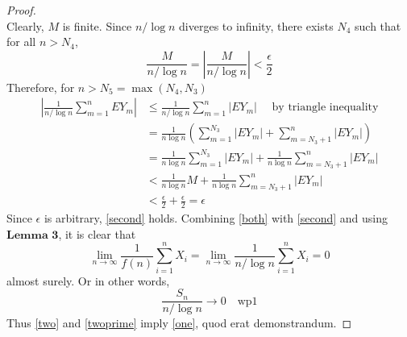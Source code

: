 \documentclass[letterpaper, 12pt]{article}
\begin{document}
\begin{proof}
\[\]
Clearly, $M$ is finite. Since $n / \log n$ diverges to infinity, there exists $N_4$ such that for all $n > N_4$,
\[
\frac{M}{n /\log n} 
=
\left\lvert
\frac{M}{n /\log n}
\right\rvert
< \frac{\epsilon}{2}
\]
Therefore, for $n > N_5 = \max(N_4, N_3)$
\begin{align*}
\left \lvert
\frac{1}{n / \log n}
\sum_{m = 1}^n EY_m
\right \rvert
&\leq
\frac{1}{n / \log n}
\sum_{m = 1}^n |EY_m|
\quad\text{ by triangle inequality}
\\
&=
\frac{1}{n \log n}
\left(
\sum_{m=1}^{N_3}
|EY_m|
+
\sum_{m=N_3+1}^{n}
|EY_m|
\right)
\\
&=
\frac{1}{n \log n}
\sum_{m=1}^{N_3}
|EY_m|
+
\frac{1}{n \log n}
\sum_{m=N_3+1}^{n}
|EY_m|
\\
&<
\frac{1}{n \log n}
M
+
\frac{1}{n \log n}
\sum_{m=N_3+1}^{n}
|EY_m|
\\
&<
\frac{\epsilon}{2}
+
\frac{\epsilon}{2}
=
\epsilon
\end{align*}
Since $\epsilon$ is arbitrary, \eqref{second} holds. 
Combining \eqref{both} with \eqref{second} and using $\textbf{Lemma 3}$, it is clear that 
\[
\lim_{n\to\infty} \frac{1}{f(n)}\sum_{i=1}^nX_i 
=
\lim_{n\to\infty} \frac{1}{n/\log n}\sum_{i=1}^nX_i 
=
0
\]
almost surely. Or in other words,
\[
\frac{S_n}{n/\log n}
\to
0
\quad \text{wp}1
\]
Thus \eqref{two} and \eqref{twoprime} imply \eqref{one}, quod erat demonstrandum.
\end{proof}
\end{document}
